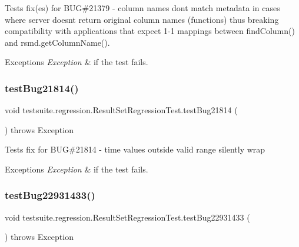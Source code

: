 Tests fix(es) for B\+UG\#21379 -\/ column names don\textquotesingle{}t match metadata in cases where server doesn\textquotesingle{}t return original column names (functions) thus breaking compatibility with applications that expect 1-\/1 mappings between find\+Column() and rsmd.\+get\+Column\+Name().


\begin{DoxyExceptions}{Exceptions}
{\em Exception} & if the test fails. \\
\hline
\end{DoxyExceptions}
\mbox{\label{classtestsuite_1_1regression_1_1_result_set_regression_test_a13c63c3fff5de437e9d908260d7edff8}} 
\subsubsection{\texorpdfstring{test\+Bug21814()}{testBug21814()}}
{\footnotesize\ttfamily void testsuite.\+regression.\+Result\+Set\+Regression\+Test.\+test\+Bug21814 (\begin{DoxyParamCaption}{ }\end{DoxyParamCaption}) throws Exception}

Tests fix for B\+UG\#21814 -\/ time values outside valid range silently wrap


\begin{DoxyExceptions}{Exceptions}
{\em Exception} & if the test fails. \\
\hline
\end{DoxyExceptions}
\mbox{\label{classtestsuite_1_1regression_1_1_result_set_regression_test_a4280c4f75edf35720e0d0c71a78dfc3b}} 
\subsubsection{\texorpdfstring{test\+Bug22931433()}{testBug22931433()}}
{\footnotesize\ttfamily void testsuite.\+regression.\+Result\+Set\+Regression\+Test.\+test\+Bug22931433 (\begin{DoxyParamCaption}{ }\end{DoxyParamCaption}) throws Exception}

